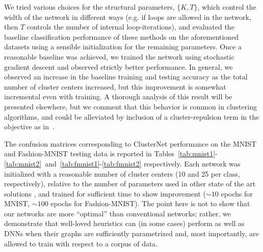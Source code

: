 \documentclass{article}
\begin{document}
We tried various choices for the structural parameters, $\{K,T\}$, which control the width of the network in different ways (e.g. if loops are allowed in the network, then $T$ controls the number of internal loop-iterations), and evaluated the baseline classification performance of these methods on the aforementioned datasets using a sensible initialization for the remaining parameters. Once a reasonable baseline was achieved, we trained the network using stochastic gradient descent and observed strictly better performance. In general, we observed an increase in the baseline training and testing accuracy as the total number of cluster centers increased, but this improvement is somewhat incremental even with training. A thorough analysis of this result will be presented elsewhere, but we comment that this behavior is common in clustering algorithms, and could be alleviated by inclusion of a cluster-repulsion term in the objective as in~\cite{chandrasekaran2017fast}.

The confusion matrices corresponding to ClusterNet performance on the MNIST and Fashion-MNIST testing data is reported in Tables~\ref{tab:mnist1}-\ref{tab:mnist2}~and~\ref{tab:fmnist1}-\ref{tab:fmnist2} respectively. Each network was initialized with a reasonable number of cluster centers (10 and 25 per class, respectively), relative to the number of parameters used in other state of the art solutions \cite{rawat2017deep}, and trained for sufficient time to show improvement ($\sim10$ epochs for MNIST, $\sim100$ epochs for Fashion-MNIST). The point here is not to show that our networks are more ``optimal'' than conventional networks; rather, we demonstrate that well-loved heuristics can (in some cases) perform as well as DNNs when their graphs are sufficiently parametrized and, most importantly, are allowed to train with respect to a corpus of data.
\end{document}

